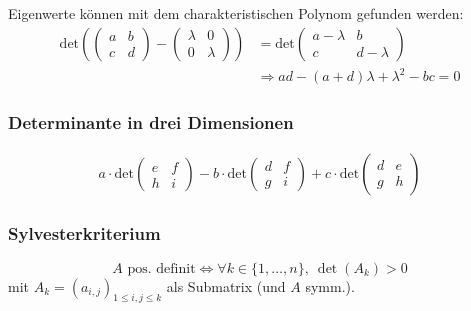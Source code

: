 \documentclass[a4paper,10pt]{article}
\begin{document}
Eigenwerte können mit dem charakteristischen Polynom gefunden werden:
\begin{align*}
    \text{det} \left(
    \begin{pmatrix}
    a           & b                                                     \\
    c           & d                                                     
    \end{pmatrix}
    -
    \begin{pmatrix}
    \lambda     & 0                                                     \\
    0           & \lambda                                               
    \end{pmatrix}
    \right)
                & =                                                     
    \text{det}
    \begin{pmatrix}
    a - \lambda & b                                                     \\
    c           & d - \lambda                                           
    \end{pmatrix}\\
                & \Rightarrow ad - (a + d) \lambda + \lambda^2 - bc = 0 
\end{align*}


\subsubsection*{Determinante in drei Dimensionen}
\begin{align*}
    a \cdot \text{det}
    \begin{pmatrix}
    e & f \\
    h & i 
    \end{pmatrix}
    - b \cdot \text{det}
    \begin{pmatrix}
    d & f \\
    g & i 
    \end{pmatrix}
    + c \cdot \text{det}
    \begin{pmatrix}
    d & e \\
    g & h 
    \end{pmatrix}
\end{align*}

\subsubsection*{Sylvesterkriterium}

$$A \text{ pos. definit} \iff \forall k\in \{1,\dots, n\},\ \det(A_k)>0 $$
mit $A_k=\left(a_{i, j}\right)_{1 \leqslant i, j \leqslant k}$ als Submatrix (und $A$ symm.). \\
\end{document}
